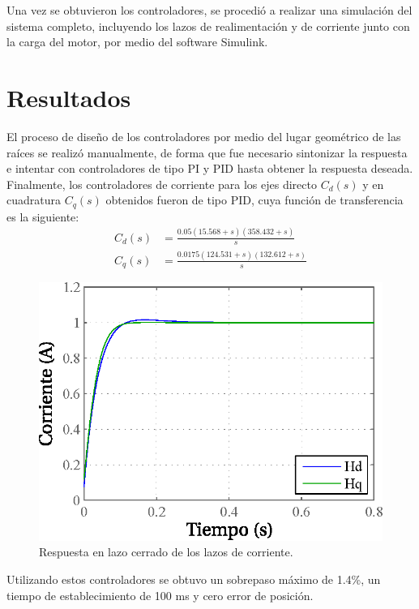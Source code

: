 Una vez se obtuvieron los controladores, se procedió a realizar una simulación del sistema completo, incluyendo los lazos de realimentación y de corriente junto con la carga del motor, por medio del software Simulink.

\section{Resultados}
El proceso de diseño de los controladores por medio del lugar geométrico de las raíces se realizó manualmente, de forma que fue necesario sintonizar la respuesta e intentar con controladores de tipo PI y PID hasta obtener la respuesta deseada. Finalmente, los controladores de corriente para los ejes directo $C_d(s)$ y en cuadratura $C_q(s)$ obtenidos fueron de tipo PID, cuya función de transferencia es la siguiente:
\begin{align*}
C_d(s) &= \frac{0.05(15.568+s)(358.432+s)}{s}\\
C_q(s) &= \frac{0.0175(124.531+s)(132.612+s)}{s}
\end{align*}

\begin{figure}[t]
\centering
\includegraphics[scale=0.8]{../img/Diseno_de_un_controlador_de_velocidad/closedloopcurrent.eps}
\caption{Respuesta en lazo cerrado de los lazos de corriente.}
\label{fig:closedloopcurrent}
\end{figure}

Utilizando estos controladores se obtuvo un sobrepaso máximo de 1.4\%, un tiempo de establecimiento de 100 ms y cero error de posición.

